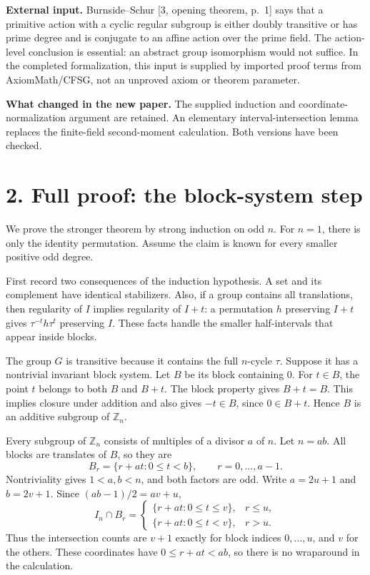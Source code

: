 \documentclass[11pt]{article}
\newcommand{\Z}{\mathbb Z}
\begin{document}
\textbf{External input.} Burnside--Schur [3, opening theorem, p.~1]
says that a primitive action with a cyclic regular subgroup is either
doubly transitive or has prime degree and is conjugate to an affine
action over the prime field. The action-level conclusion is essential:
an abstract group isomorphism would not suffice. In the completed
formalization, this input is supplied by imported proof terms from
AxiomMath/CFSG, not an unproved axiom or theorem parameter.

\textbf{What changed in the new paper.} The supplied induction and
coordinate-normalization argument are retained. An elementary
interval-intersection lemma replaces the finite-field second-moment
calculation. Both versions have been checked.

\newpage
\section*{2. Full proof: the block-system step}
We prove the stronger theorem by strong induction on odd $n$. For
$n=1$, there is only the identity permutation. Assume the claim is
known for every smaller positive odd degree.

First record two consequences of the induction hypothesis. A set
and its complement have identical stabilizers. Also, if a group
contains all translations, then regularity of $I$ implies regularity
of $I+t$: a permutation $h$ preserving $I+t$ gives
$\tau^{-t}h\tau^t$ preserving $I$. These facts handle the smaller
half-intervals that appear inside blocks.

The group $G$ is transitive because it contains the full $n$-cycle
$\tau$. Suppose it has a nontrivial invariant block system.
Let $B$ be its block containing $0$. For $t\in B$, the point $t$
belongs to both $B$ and $B+t$. The block property gives $B+t=B$.
This implies closure under addition and also gives $-t\in B$,
since $0\in B+t$. Hence $B$ is an additive subgroup of $\Z_n$.

Every subgroup of $\Z_n$ consists of multiples of a divisor $a$
of $n$. Let $n=ab$. All blocks are translates of $B$, so they are
\[
 B_r=\{r+at:0\leq t<b\},\qquad r=0,\ldots,a-1.
\]
Nontriviality gives $1<a,b<n$, and both factors are odd. Write
$a=2u+1$ and $b=2v+1$. Since $(ab-1)/2=av+u$,
\[
 I_n\cap B_r=
 \begin{cases}
 \{r+at:0\leq t\leq v\},&r\leq u,\\
 \{r+at:0\leq t<v\},&r>u.
 \end{cases}
\]
Thus the intersection counts are $v+1$ exactly for block indices
$0,\ldots,u$, and $v$ for the others. These coordinates have
$0\leq r+at<ab$, so there is no wraparound in the calculation.
\end{document}
